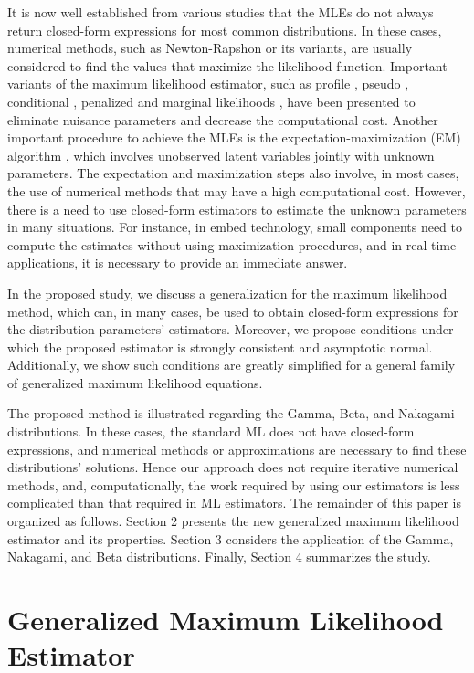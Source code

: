 \documentclass[10pt,a4paper,onecolumn]{article} %
\begin{document}
It is now well established from various studies that the MLEs do not always return closed-form expressions for most common distributions. In these cases, numerical methods, such as Newton-Rapshon or its variants, are usually considered to find the values that maximize the likelihood function. Important variants of the maximum likelihood estimator, such as profile \citep{murphy2000profile}, pseudo \citep{gourieroux1984pseudo}, conditional \citep{andersen1970asymptotic}, penalized \citep{anderson1982penalized, firth1993bias} and marginal likelihoods \citep{cox1975partial}, have been presented to eliminate nuisance parameters and decrease the computational cost. Another important procedure to achieve the MLEs is the expectation-maximization (EM) algorithm \citep{dempster1977maximum}, which involves unobserved latent variables jointly with unknown parameters. The expectation and maximization steps also involve, in most cases, the use of numerical methods that may have a high computational cost. However, there is a need to use closed-form estimators to estimate the unknown parameters in many situations. For instance, in embed technology, small components need to compute the estimates without using maximization procedures, and in real-time applications, it is necessary to provide an immediate answer.

In the proposed study, we discuss a generalization for the maximum likelihood  method, which can, in many cases, be used to obtain closed-form expressions for the distribution parameters' estimators. Moreover, we propose conditions under which the proposed estimator is strongly consistent and asymptotic normal. Additionally, we show such conditions are greatly simplified for a general family of generalized maximum likelihood equations.

The proposed method is illustrated regarding the Gamma, Beta, and Nakagami distributions. In these cases, the standard ML does not have closed-form expressions, and numerical methods or approximations are necessary to find these distributions' solutions. Hence our approach does not require iterative numerical methods, and, computationally, the work required by using our estimators is less complicated than that required in ML estimators. The remainder of this paper is organized as follows. Section 2 presents the new generalized maximum likelihood estimator and its properties. Section 3 considers the application of the Gamma, Nakagami, and Beta distributions. Finally, Section 4 summarizes the study.


\section{Generalized Maximum Likelihood Estimator}
\end{document}
